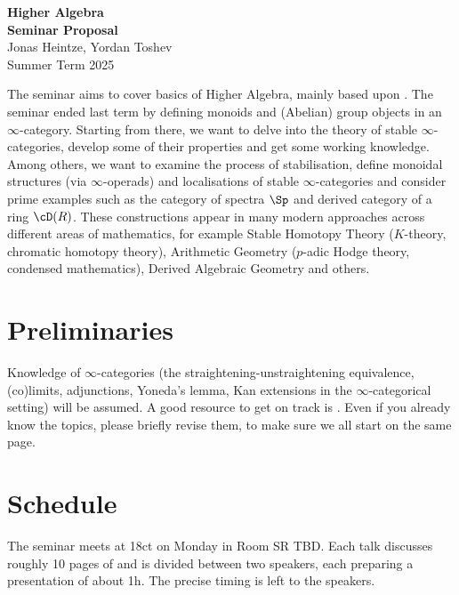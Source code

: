 \documentclass{article}
\begin{document}
\begin{center}
  \huge{\bf{Higher Algebra}}\vspace{5pt}
\\
\textbf{Seminar Proposal}\\
Jonas Heintze, Yordan Toshev\\
Summer Term 2025
\end{center}




The seminar aims to cover basics of Higher Algebra, mainly based
upon \cite[Chapter II]{K-ThrNotes}.
The seminar ended last term by defining monoids and 
(Abelian) group objects in an $\infty$-category.
Starting from there, we want to delve into the
theory of stable $\infty$-categories, develop some
of their properties and get some working knowledge.
Among others, we want to examine the process of
stabilisation, define monoidal structures (via $\infty$-operads) 
and localisations 
of stable $\infty$-categories and consider prime examples such as
the category of spectra $\Sp$ and derived category of a 
ring $\cD(R)$.
These constructions appear in many modern approaches across different areas of 
mathematics,
for example
Stable Homotopy Theory ($K$-theory, chromatic homotopy theory),
Arithmetic Geometry ($p$-adic Hodge theory, condensed mathematics),
Derived Algebraic Geometry and others.


\section*{Preliminaries}
Knowledge of $\infty$-categories
(the straightening-unstraightening equivalence, (co)limits,
adjunctions, Yoneda's lemma, Kan extensions in the $\infty$-categorical
setting) will be assumed.
A good resource to get on track is \cite[Chapters 1-6]{infty-CatNotes}.
Even if you already know the topics, please briefly revise them,
to make sure we all start on the same page.


\section*{Schedule}

The seminar meets at 18ct on Monday in Room SR TBD.
Each talk discusses roughly 10 pages of \cite{K-ThrNotes} and 
is divided between two speakers, each
preparing a presentation of about 1h.
The precise timing is left to the speakers.
\end{document}
